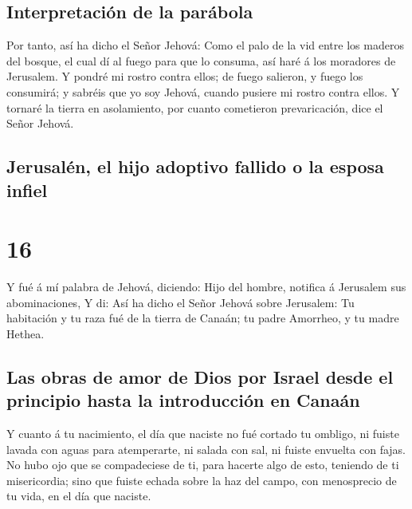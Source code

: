 \hypertarget{interpretaciuxf3n-de-la-paruxe1bola}{%
\subsection{Interpretación de la
parábola}\label{interpretaciuxf3n-de-la-paruxe1bola}}

 Por tanto, así ha dicho el Señor Jehová: Como el palo de la
vid entre los maderos del bosque, el cual dí al fuego para que lo
consuma, así haré á los moradores de Jerusalem.  Y pondré mi
rostro contra ellos; de fuego salieron, y fuego los consumirá; y sabréis
que yo soy Jehová, cuando pusiere mi rostro contra ellos.  Y
tornaré la tierra en asolamiento, por cuanto cometieron prevaricación,
dice el Señor Jehová.

\hypertarget{jerusaluxe9n-el-hijo-adoptivo-fallido-o-la-esposa-infiel}{%
\subsection{Jerusalén, el hijo adoptivo fallido o la esposa
infiel}\label{jerusaluxe9n-el-hijo-adoptivo-fallido-o-la-esposa-infiel}}

\hypertarget{section-15}{%
\section{16}\label{section-15}}

 Y fué á mí palabra de Jehová, diciendo:  Hijo
del hombre, notifica á Jerusalem sus abominaciones,  Y di:
Así ha dicho el Señor Jehová sobre Jerusalem: Tu habitación y tu raza
fué de la tierra de Canaán; tu padre Amorrheo, y tu madre Hethea.

\hypertarget{las-obras-de-amor-de-dios-por-israel-desde-el-principio-hasta-la-introducciuxf3n-en-canauxe1n}{%
\subsection{Las obras de amor de Dios por Israel desde el principio
hasta la introducción en
Canaán}\label{las-obras-de-amor-de-dios-por-israel-desde-el-principio-hasta-la-introducciuxf3n-en-canauxe1n}}

 Y cuanto á tu nacimiento, el día que naciste no fué cortado
tu ombligo, ni fuiste lavada con aguas para atemperarte, ni salada con
sal, ni fuiste envuelta con fajas.  No hubo ojo que se
compadeciese de ti, para hacerte algo de esto, teniendo de ti
misericordia; sino que fuiste echada sobre la haz del campo, con
menosprecio de tu vida, en el día que naciste.

